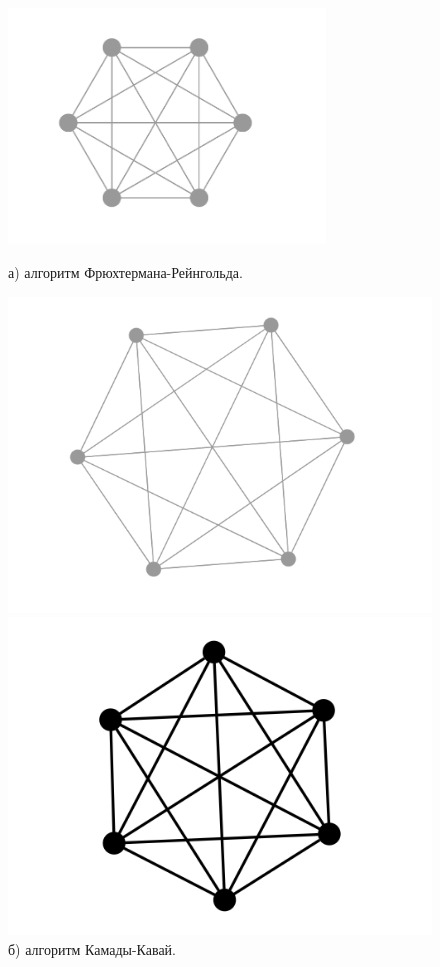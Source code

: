\documentclass[14pt, russian]{scrartcl}
\begin{document}
\begin{figure}[H]
	\centering
	\begin{minipage}[t]{.55\textwidth}
		\centering
		\includegraphics[width=0.75\textwidth]{./imgs/fg_k6.png}
		\caption*{а) алгоритм Фрюхтермана-Рейнгольда.}
	\end{minipage}
	\noindent
	\begin{minipage}[t]{.45\linewidth}
		\centering
		\includegraphics[width=\textwidth]{./imgs/kk_k6.png}
		\caption*{б) алгоритм Камады-Кавай.}
	\end{minipage}
	\begin{minipage}[t]{.45\textwidth}
		\centering
		\includegraphics[width=\linewidth]{./imgs/k6_gv.png}

\end{minipage}
\end{figure}
\end{document}
